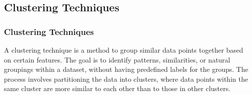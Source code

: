 \documentclass[xcolor={dvipsnames}]{beamer}
\begin{document}
\subsection{Clustering Techniques}
\begin{frame}
\frametitle{Clustering Techniques}


A clustering technique is a method to group similar data points together based on certain features. The goal is to identify patterns, similarities, or natural groupings within a dataset, without having predefined labels for the groups. The process involves partitioning the data into clusters, where data points within the same cluster are more similar to each other than to those in other clusters.

\pause

\hfill

\begin{table}
    \centering
    \vspace{-0.4cm}
    \caption{Examples of Non-Parametric and Parametric Clustering Techniques}
    \vskip -0.5cm
\end{table}

\end{frame}
\end{document}
